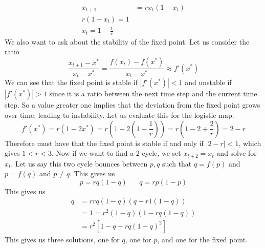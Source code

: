 \documentclass{article}
\newcommand{\twen}{\hspace{20pt}}
\theoremstyle{definition}
\begin{document}
\begin{align*}
    x_{t+1} &= rx_t (1-x_t) \\
    r(1-x_t) = 1 \\
    x_t = 1 - \frac{1}{r}
\end{align*}
We also want to ask about the stability of the fixed point. Let us consider the ratio 
\begin{equation*}
    \frac{x_{t+1}-x^*}{x_t-x^* } = \frac{f(x_t)-f(x^*)}{x_t-x^* } \approx f'(x^*)
\end{equation*}
We can see that the fixed point is stable if $|f'(x^*)| < 1$ and unstable if $|f'(x^*)| > 1$ since it is a ratio between the next time step and the current time step. So a value greater one implies that the deviation from the fixed point grows over time, leading to instability. Let us evaluate this for the logistic map.
\begin{equation*}
    f'(x^*) = r (1-2x^*) = r \left(1-2\left(1-\frac{1}{r}\right)\right) = r \left(1-2+\frac{2}{r}\right) = 2-r
\end{equation*}
Therefore must have that the fixed point is stable if and only if $|2-r| < 1$, which gives $1 < r < 3$. Now if we want to find a 2-cycle, we set $x_{t+2} = x_t$ and solve for $x_t$. Let us say this two cycle bounces between $p,q$ such that $q = f(p)$ and $p = f(q)$ and $p \neq q$. This gives us 
\begin{equation*}
    p=rq(1-q) \twen q=rp(1-p)
\end{equation*}
This gives us 
\begin{align*}
    q& = rrq(1-q)(q-r1(1-q)) \\
    &= 1= r^2(1-q)(1-rq(1-q)) \\
    &= r^2[1-q-rq(1-q)^2]
\end{align*}
This gives us three solutions, one for $q$, one for $p$, and one for the fixed point.
\end{document}
